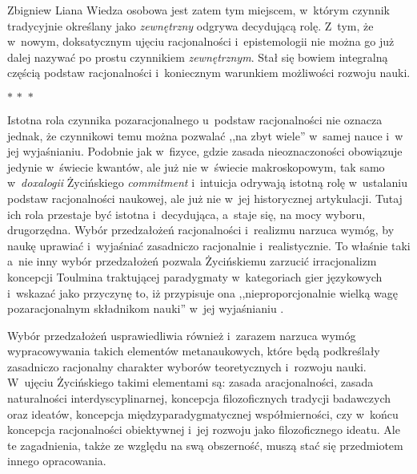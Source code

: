 \begin{artplenv}{Zbigniew Liana}
Wiedza osobowa jest zatem tym miejscem, w~którym czynnik tradycyjnie określany jako \textit{zewnętrzny} odgrywa decydującą rolę. Z~tym, że w~nowym, doksatycznym ujęciu racjonalności i~epistemologii nie można go już dalej nazywać po prostu czynnikiem \textit{zewnętrznym}. Stał się bowiem integralną częścią podstaw racjonalności i~koniecznym warunkiem możliwości rozwoju nauki.

\begin{center}
$ {\ast}\,{\ast}\,{\ast} $
\end{center}

Istotna rola czynnika pozaracjonalnego u~podstaw racjonalności nie oznacza jednak, że czynnikowi temu można pozwalać ,,na zbyt wiele'' w~samej nauce i~w jej wyjaśnianiu. Podobnie jak w~fizyce, gdzie zasada nieoznaczoności obowiązuje jedynie w~świecie kwantów, ale już nie w~świecie makroskopowym, tak samo w~\textit{doxalogii} Życińskiego \textit{commitment} i~intuicja odrywają istotną rolę w~ustalaniu podstaw racjonalności naukowej, ale już nie w~jej historycznej artykulacji. Tutaj ich rola przestaje być istotna i~decydująca, a~staje się, na mocy wyboru, drugorzędna. Wybór przedzałożeń racjonalności i~realizmu narzuca wymóg, by naukę uprawiać i~wyjaśniać zasadniczo racjonalnie i~realistycznie. To właśnie taki a~nie inny wybór przedzałożeń pozwala Życińskiemu zarzucić irracjonalizm koncepcji Toulmina traktującej paradygmaty w~kategoriach gier językowych i~wskazać jako przyczynę to, iż przypisuje ona ,,nieproporcjonalnie wielką wagę pozaracjonalnym składnikom nauki'' w~jej wyjaśnianiu
\parencites[][s.~202]{zycinski_elementy_1996}[][s.~275]{zycinski_elementy_2015}.%


Wybór przedzałożeń usprawiedliwia również i~zarazem narzuca wymóg wypracowywania takich elementów metanaukowych, które będą podkreślały zasadniczo racjonalny charakter wyborów teoretycznych i~rozwoju nauki. W~ujęciu Życińskiego takimi elementami są: zasada aracjonalności, zasada naturalności interdyscyplinarnej, koncepcja filozoficznych tradycji badawczych oraz ideatów, koncepcja międzyparadygmatycznej współmierności, czy w~końcu koncepcja racjonalności obiektywnej i~jej rozwoju jako filozoficznego ideatu. Ale te zagadnienia, także ze względu na swą obszerność, muszą stać się przedmiotem innego opracowania.


\end{artplenv}
